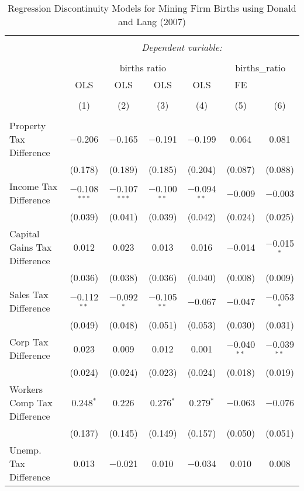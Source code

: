 
\begin{table}[!htbp] \centering 
  \caption{Regression Discontinuity Models for  Mining Firm Births using Donald and Lang (2007)} 
  \label{} 
\begin{tabular}{@{\extracolsep{5pt}}lcccccc} 
\\[-1.8ex]\hline 
\hline \\[-1.8ex] 
 & \multicolumn{6}{c}{\textit{Dependent variable:}} \\ 
\cline{2-7} 
\\[-1.8ex] & \multicolumn{4}{c}{births ratio} & \multicolumn{2}{c}{births\_ratio} \\ 
 & OLS & OLS & OLS & OLS & FE &  \\ 
\\[-1.8ex] & (1) & (2) & (3) & (4) & (5) & (6)\\ 
\hline \\[-1.8ex] 
 Property Tax Difference & $-$0.206 & $-$0.165 & $-$0.191 & $-$0.199 & 0.064 & 0.081 \\ 
  & (0.178) & (0.189) & (0.185) & (0.204) & (0.087) & (0.088) \\ 
  Income Tax Difference & $-$0.108$^{***}$ & $-$0.107$^{***}$ & $-$0.100$^{**}$ & $-$0.094$^{**}$ & $-$0.009 & $-$0.003 \\ 
  & (0.039) & (0.041) & (0.039) & (0.042) & (0.024) & (0.025) \\ 
  Capital Gains Tax Difference & 0.012 & 0.023 & 0.013 & 0.016 & $-$0.014 & $-$0.015$^{*}$ \\ 
  & (0.036) & (0.038) & (0.036) & (0.040) & (0.008) & (0.009) \\ 
  Sales Tax Difference & $-$0.112$^{**}$ & $-$0.092$^{*}$ & $-$0.105$^{**}$ & $-$0.067 & $-$0.047 & $-$0.053$^{*}$ \\ 
  & (0.049) & (0.048) & (0.051) & (0.053) & (0.030) & (0.031) \\ 
  Corp Tax Difference & 0.023 & 0.009 & 0.012 & 0.001 & $-$0.040$^{**}$ & $-$0.039$^{**}$ \\ 
  & (0.024) & (0.024) & (0.023) & (0.024) & (0.018) & (0.019) \\ 
  Workers Comp Tax Difference & 0.248$^{*}$ & 0.226 & 0.276$^{*}$ & 0.279$^{*}$ & $-$0.063 & $-$0.076 \\ 
  & (0.137) & (0.145) & (0.149) & (0.157) & (0.050) & (0.051) \\ 
  Unemp. Tax Difference & 0.013 & $-$0.021 & 0.010 & $-$0.034 & 0.010 & 0.008 \\ 

\end{tabular}
\end{table}
